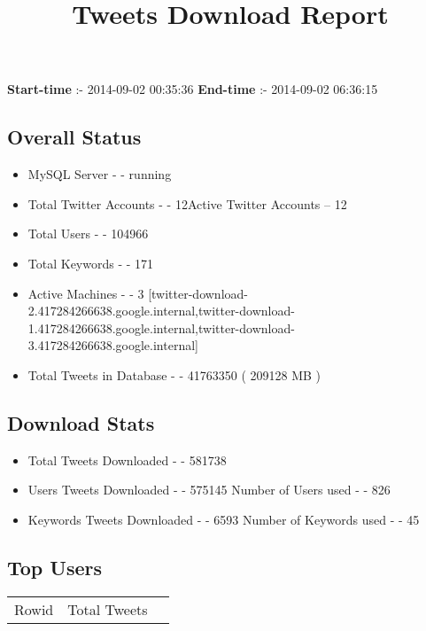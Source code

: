 \documentclass{article}\usepackage[T1]{fontenc}
\begin{document}
\title{\textbf{Tweets Download Report}}
               \date{}
                \maketitle
               \centerline{\textbf{Start-time} :- 2014-09-02 00:35:36 \hspace{40pt} \textbf{End-time} :- 2014-09-02 06:36:15}               \subsection*{Overall Status}                \begin{itemize}                \item MySQL Server - - running               \item Total Twitter Accounts - - 12\newline Active Twitter Accounts -- 12               \item Total Users - - 104966               \item Total Keywords - - 171               \item Active Machines - - 3 [twitter-download-2.417284266638.google.internal,twitter-download-1.417284266638.google.internal,twitter-download-3.417284266638.google.internal]               \item Total Tweets in Database - - 41763350 ( 209128 MB )               \end{itemize}               \subsection*{Download Stats}                \begin{itemize}                \item Total Tweets Downloaded - - 581738               \item Users Tweets Downloaded - - 575145 \newline Number of Users used - - 826               \item Keywords Tweets Downloaded - - 6593 \newline Number of Keywords used - - 45              \end{itemize}              \subsection*{Top Users}\begin{tabular}{|c|c|c|}         \hline         Rowid & Total Tweets \\ 

\end{tabular}
\end{document}
